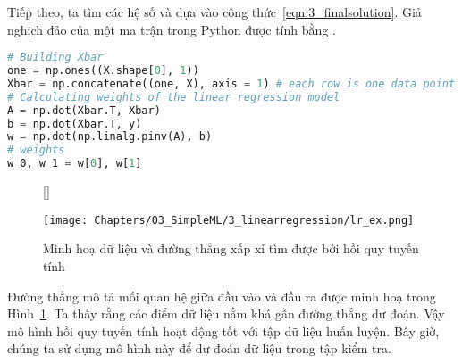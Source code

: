 Tiếp theo, ta tìm các hệ số  và
 dựa vào công thức~\eqref{eqn:3_finalsolution}. Giả
nghịch đảo của một ma trận  trong Python được tính bằng
.%




\begin{lstlisting}[language=Python]
# Building Xbar
one = np.ones((X.shape[0], 1))
Xbar = np.concatenate((one, X), axis = 1) # each row is one data point
# Calculating weights of the linear regression model
A = np.dot(Xbar.T, Xbar)
b = np.dot(Xbar.T, y)
w = np.dot(np.linalg.pinv(A), b)
# weights
w_0, w_1 = w[0], w[1]
\end{lstlisting}




\begin{figure}[t]
[\FBwidth]
{\caption{
Minh hoạ dữ liệu và đường thẳng xấp xỉ tìm được bởi hồi quy tuyến tính
}
\label{fig:3_2}}
{ %
\texttt{[image: Chapters/03\_SimpleML/3\_linearregression/lr\_ex.png]}
}
\end{figure}
Đường thẳng mô tả mối quan hệ giữa đầu vào và đầu ra được minh hoạ trong
Hình~\ref{fig:3_2}. Ta thấy rằng các điểm dữ liệu nằm khá gần đường thẳng dự
đoán. Vậy mô hình hồi quy tuyến tính hoạt động tốt với tập dữ liệu huấn luyện.
Bây giờ, chúng ta sử dụng mô hình này để dự đoán dữ liệu trong tập kiểm tra.

